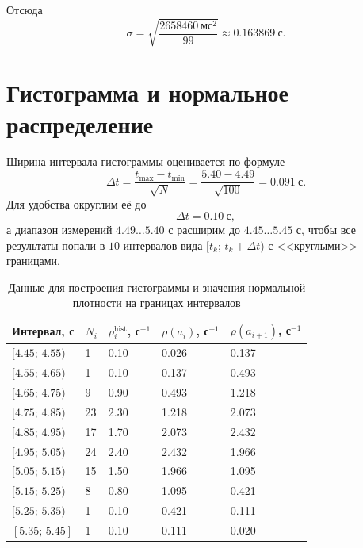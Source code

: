 \documentclass[12pt]{article}
\begin{document}
	Отсюда
	\[
		\sigma = \sqrt{\frac{2658460 \ \text{мс}^2}{99}}
		\approx 0.163869 \ \text{с}.
	\]

	\section{Гистограмма и нормальное распределение}

	Ширина интервала гистограммы оценивается по формуле
	\[
		\Delta t = \frac{t_{\max} - t_{\min}}{\sqrt N} = \frac{5.40 - 4.49}{\sqrt{100}} = 0.091 \ \text{с}.
	\]
	Для удобства округлим её до
	\[
		\Delta t = 0.10 \ \text{с},
	\]
	а диапазон измерений $4.49 \dots 5.40$ с расширим до $4.45 \dots 5.45$ с, чтобы все результаты попали в $10$ интервалов вида $[t_k; \, t_k + \Delta t)$ с <<круглыми>> границами.

	\begin{table}[H]
		\centering
		\small
		\begin{xltabular}{\textwidth}{@{}X X X X X@{}}
			\toprule
			Интервал, с & $N_i$ & $\rho_i^{\mathrm{hist}}$, с$^{-1}$ &
			$\rho(a_i)$, с$^{-1}$ & $\rho(a_{i + 1})$, с$^{-1}$\\
			\midrule
			$[4.45; \, 4.55)$ & 1  & 0.10 & 0.026 & 0.137 \\
			$[4.55; \, 4.65)$ & 1  & 0.10 & 0.137 & 0.493 \\
			$[4.65; \, 4.75)$ & 9  & 0.90 & 0.493 & 1.218 \\
			$[4.75; \, 4.85)$ & 23 & 2.30 & 1.218 & 2.073 \\
			$[4.85; \, 4.95)$ & 17 & 1.70 & 2.073 & 2.432 \\
			$[4.95; \, 5.05)$ & 24 & 2.40 & 2.432 & 1.966 \\
			$[5.05; \, 5.15)$ & 15 & 1.50 & 1.966 & 1.095 \\
			$[5.15; \, 5.25)$ & 8  & 0.80 & 1.095 & 0.421 \\
			$[5.25; \, 5.35)$ & 1  & 0.10 & 0.421 & 0.111 \\
			$[5.35; \, 5.45]$ & 1  & 0.10 & 0.111 & 0.020 \\
			\bottomrule
		\end{xltabular}
		\caption{Данные для построения гистограммы и значения нормальной плотности на границах интервалов}
		\label{tab:hist}
	\end{table}
\end{document}
